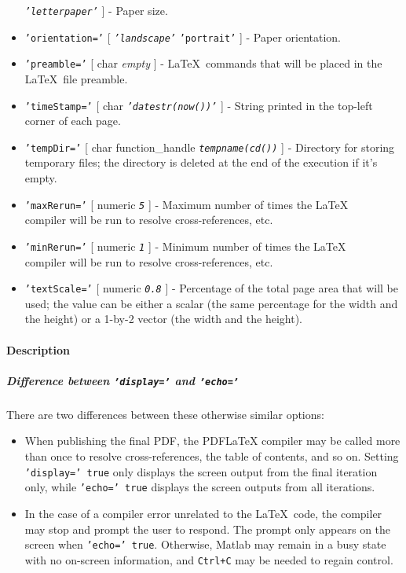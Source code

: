 \begin{itemize}
  \emph{\texttt{'letterpaper'}} {]} - Paper size.
\item
  \texttt{'orientation='} {[} \emph{\texttt{'landscape'}} \textbar{}
  \texttt{'portrait'} {]} - Paper orientation.
\item
  \texttt{'preamble='} {[} char \textbar{} \emph{empty} {]} -
  \LaTeX~commands that will be placed in the \LaTeX~file preamble.
\item
  \texttt{'timeStamp='} {[} char \textbar{}
  \emph{\texttt{'datestr(now())'}} {]} - String printed in the top-left
  corner of each page.
\item
  \texttt{'tempDir='} {[} char \textbar{} function\_handle \textbar{}
  \emph{\texttt{tempname(cd())}} {]} - Directory for storing temporary
  files; the directory is deleted at the end of the execution if it's
  empty.
\item
  \texttt{'maxRerun='} {[} numeric \textbar{} \emph{\texttt{5}} {]} -
  Maximum number of times the \LaTeX\\compiler will be run to resolve
  cross-references, etc.
\item
  \texttt{'minRerun='} {[} numeric \textbar{} \emph{\texttt{1}} {]} -
  Minimum number of times the \LaTeX\\compiler will be run to resolve
  cross-references, etc.
\item
  \texttt{'textScale='} {[} numeric \textbar{} \emph{\texttt{0.8}} {]} -
  Percentage of the total page area that will be used; the value can be
  either a scalar (the same percentage for the width and the height) or
  a 1-by-2 vector (the width and the height).
\end{itemize}

\paragraph{Description}\label{description}

\subparagraph{Difference between \texttt{'display='} and
\texttt{'echo='}}\label{difference-between-display-and-echo}

There are two differences between these otherwise similar options:

\begin{itemize}
\item
  When publishing the final PDF, the PDFLaTeX compiler may be called
  more than once to resolve cross-references, the table of contents, and
  so on. Setting \texttt{'display=' true} only displays the screen
  output from the final iteration only, while \texttt{'echo=' true}
  displays the screen outputs from all iterations.
\item
  In the case of a compiler error unrelated to the \LaTeX~code, the
  compiler may stop and prompt the user to respond. The prompt only
  appears on the screen when \texttt{'echo=' true}. Otherwise, Matlab
  may remain in a busy state with no on-screen information, and
  \texttt{Ctrl+C} may be needed to regain control.
\end{itemize}

